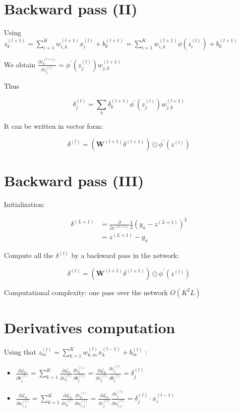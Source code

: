 \section*{Backward pass (II)}
Using $z_{k}^{(l+1)}=\sum_{i=1}^{K} w_{i, k}^{(l+1)} x_{i}^{(l)}+b_{k}^{(l+1)}=\sum_{i=1}^{K} w_{i, k}^{(l+1)} \phi\left(z_{i}^{(l)}\right)+b_{k}^{(l+1)}$

We obtain $\frac{\partial z_{k}^{(l+1)}}{\partial z_{j}^{(l)}}=\phi^{\prime}\left(z_{j}^{(l)}\right) w_{j, k}^{(l+1)}$

Thus

$$
\delta_{j}^{(l)}=\sum_{k} \delta_{k}^{(l+1)} \phi^{\prime}\left(z_{j}^{(l)}\right) w_{j, k}^{(l+1)}
$$

It can be written in vector form:

$$
\delta^{(l)}=\left(\mathbf{W}^{(l+1)} \delta^{(l+1)}\right) \odot \phi^{\prime}\left(z^{(l)}\right)
$$

\section*{Backward pass (III)}
Initialization:

$$
\begin{aligned}
\delta^{(L+1)} & =\frac{\partial}{\partial z^{(L+1)}} \frac{1}{2}\left(y_{n}-z^{(L+1)}\right)^{2} \\
& =z^{(L+1)}-y_{n}
\end{aligned}
$$



Compute all the $\delta^{(l)}$ by a backward pass in the network:

$$
\delta^{(l)}=\left(\mathbf{W}^{(l+1)} \delta^{(l+1)}\right) \odot \phi^{\prime}\left(z^{(l)}\right)
$$

Computational complexity: one pass over the network $O\left(K^{2} L\right)$

\section*{Derivatives computation}


Using that $z_{m}^{(l)}=\sum_{k=1}^{K} w_{k, m}^{(l)} x_{k}^{(l-1)}+b_{m}^{(l)}$ :

\begin{itemize}
  \item $\frac{\partial \mathscr{L}_{n}}{\partial b_{j}^{(l)}}=\sum_{k=1}^{K} \frac{\partial \mathscr{L}_{n}}{\partial z_{k}^{(l)}} \frac{\partial z_{k}^{(l)}}{\partial b_{j}^{(l)}}=\frac{\partial \mathscr{L}_{n}}{\partial z_{j}^{(l)}} \frac{\partial z_{j}^{(l)}}{\partial b_{j}^{(l)}}=\delta_{j}^{(l)}$

  \item $\frac{\partial \mathscr{L}_{n}}{\partial w_{i, j}^{(l)}}=\sum_{k=1}^{K} \frac{\partial \mathscr{L}_{n}}{\partial z_{k}^{(l)}} \frac{\partial z_{k}^{(l)}}{\partial w_{i, j}^{(l)}}=\frac{\partial \mathscr{L}_{n}}{\partial z_{j}^{(l)}} \frac{\partial z_{j}^{(l)}}{\partial w_{i, j}^{(l)}}=\delta_{j}^{(l)} \cdot x_{i}^{(l-1)}$

\end{itemize}

